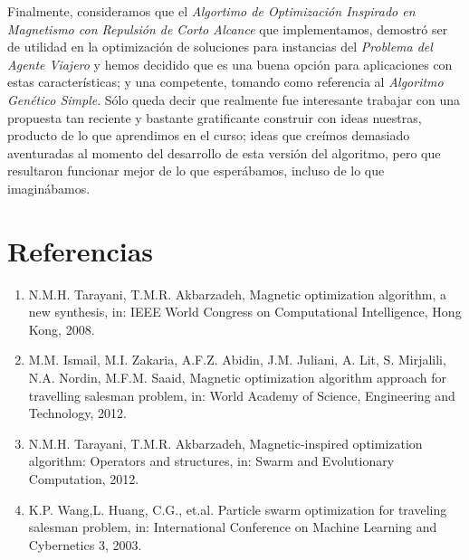 \documentclass[12pt]{article}
\begin{document}
Finalmente, consideramos que el \textit{Algortimo de Optimización Inspirado en Magnetismo con Repulsión de Corto Alcance} que implementamos, demostró ser de utilidad en la optimización de soluciones para instancias del \textit{Problema del Agente Viajero} y hemos decidido que es una buena opción para aplicaciones con estas características; y una competente, tomando como referencia al \textit{Algoritmo Genético Simple}. Sólo queda decir que realmente fue interesante trabajar con una propuesta tan reciente y bastante gratificante construir con ideas nuestras, producto de lo que aprendimos en el curso; ideas que creímos demasiado aventuradas al momento del desarrollo de esta versión del algoritmo, pero que resultaron funcionar mejor de lo que esperábamos, incluso de lo que imaginábamos.


\section{Referencias}\label{sec:ref}


\begin{enumerate}
\item N.M.H. Tarayani, T.M.R. Akbarzadeh, Magnetic optimization algorithm, a new synthesis, in: IEEE World Congress on Computational Intelligence, Hong Kong, 2008.

\item M.M. Ismail, M.I. Zakaria, A.F.Z. Abidin, J.M. Juliani, A. Lit, S. Mirjalili, N.A. Nordin, M.F.M. Saaid, Magnetic optimization algorithm approach for travelling salesman problem, in: World Academy of Science, Engineering and Technology, 2012.

\item N.M.H. Tarayani, T.M.R. Akbarzadeh, Magnetic-inspired optimization algorithm: Operators and structures, in: Swarm and Evolutionary Computation, 2012.

\item K.P. Wang,L. Huang, C.G., et.al. Particle swarm optimization for traveling salesman problem, in: International Conference on Machine  Learning
  and Cybernetics 3, 2003.

\end{enumerate}
\end{document}
